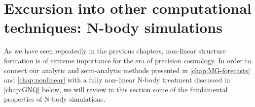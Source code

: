 %
%
%
%
%
%


\section{Excursion into other computational techniques: N-body simulations \label{sec:Computational}}


As we have seen repeatedly in the previous chapters, non-linear structure formation 
is of extreme importance for the era of precision cosmology.
In order to connect our analytic and semi-analytic methods presented in \cref{chap:MG-forecasts}
and \cref{chap:nonlinear} with a fully non-linear N-body treatment discussed in \cref{chap:GNQ} below,
we will review in this section some of the fundamental properties of N-body simulations.

